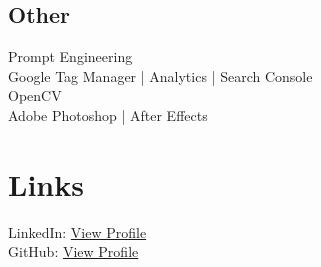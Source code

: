 \documentclass[]{deedy-resume-reversed}
\begin{document}
\begin{minipage}[t]{0.30\textwidth}
\subsection{Other}
\textbullet{} Prompt Engineering \\ \textbullet{} Google Tag Manager | Analytics | Search Console \\ \textbullet{} OpenCV \\ \textbullet{} Adobe Photoshop | After Effects 
\sectionsep


\section{Links}
LinkedIn: \href{https://www.linkedin.com/in/parfectshot/}{View Profile} \\
GitHub: \href{https://github.com/parfectshot}{View Profile} \\
\sectionsep

\end{minipage}
\end{document}
